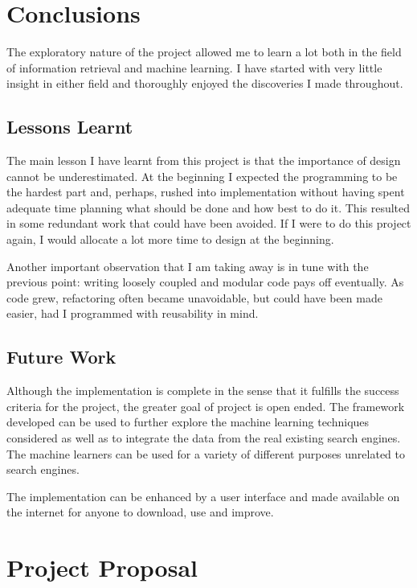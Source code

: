 \documentclass[12pt,notitlepage,twoside]{scrreprt}
\begin{document}
\chapter{Conclusions}
The exploratory nature of the project allowed me to learn a lot both in the field of
information retrieval and machine learning. I have started with very little insight in
either field and thoroughly enjoyed the discoveries I made throughout.

\section{Lessons Learnt}
The main lesson I have learnt from this project is that the importance of design cannot be
underestimated. At the beginning I expected the programming to be the hardest part and,
perhaps, rushed into implementation without having spent adequate time planning what
should be done and how best to do it. This resulted in some redundant work that
could have been avoided. If I were to do this project again, I would allocate a lot more time to
design at the beginning.

Another important observation that I am taking away is in tune with the previous point:
writing loosely coupled and modular code pays off eventually. As code grew, refactoring
often became unavoidable, but could have been made easier, had I programmed with
reusability in mind.

\section{Future Work}
Although the implementation is complete in the sense that it fulfills the success criteria
for the project, the greater goal of project is open ended. The framework developed can be
used to further explore the machine learning techniques considered as well as to integrate
the data from the real existing search engines. The machine learners can be used for a
variety of different purposes unrelated to search engines.

The implementation can be enhanced by a user interface and made available on the internet
for anyone to download, use and improve.

\cleardoublepage



\cleardoublepage

\appendix

\chapter{Project Proposal}
\label{prop}

%
\end{document}

